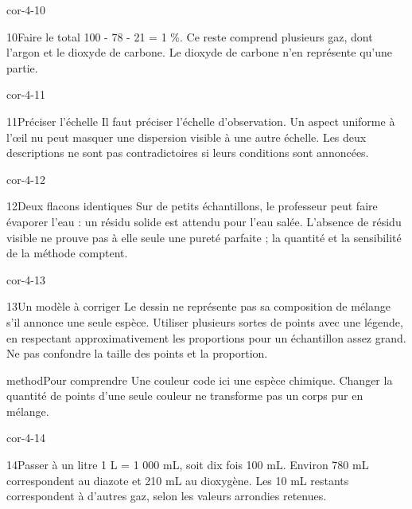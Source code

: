 \documentclass[12pt,twoside,openany]{book}
\begin{document}
\begin{blocLivre}{cor-4-10}
\begin{corrige}{10}{Faire le total}
100 - 78 - 21 = 1 \%. Ce reste comprend plusieurs gaz, dont l’argon et le dioxyde de carbone. Le dioxyde de carbone n’en représente qu’une partie.\par
\end{corrige}\end{blocLivre}
\begin{blocLivre}{cor-4-11}
\begin{corrige}{11}{Préciser l’échelle}
Il faut préciser l’échelle d’observation. Un aspect uniforme à l’œil nu peut masquer une dispersion visible à une autre échelle. Les deux descriptions ne sont pas contradictoires si leurs conditions sont annoncées.\par
\end{corrige}\end{blocLivre}
\begin{blocLivre}{cor-4-12}
\begin{corrige}{12}{Deux flacons identiques}
Sur de petits échantillons, le professeur peut faire évaporer l’eau : un résidu solide est attendu pour l’eau salée. L’absence de résidu visible ne prouve pas à elle seule une pureté parfaite ; la quantité et la sensibilité de la méthode comptent.\par
\end{corrige}\end{blocLivre}
\begin{blocLivre}{cor-4-13}
\begin{corrige}{13}{Un modèle à corriger}
Le dessin ne représente pas sa composition de mélange s’il annonce une seule espèce. Utiliser plusieurs sortes de points avec une légende, en respectant approximativement les proportions pour un échantillon assez grand. Ne pas confondre la taille des points et la proportion.\par
\begin{pcEncadre}{method}{Pour comprendre}
Une couleur code ici une espèce chimique. Changer la quantité de points d’une seule couleur ne transforme pas un corps pur en mélange.\par
\end{pcEncadre}
\end{corrige}\end{blocLivre}
\begin{blocLivre}{cor-4-14}
\begin{corrige}{14}{Passer à un litre}
1 L = 1 000 mL, soit dix fois 100 mL. Environ 780 mL correspondent au diazote et 210 mL au dioxygène. Les 10 mL restants correspondent à d’autres gaz, selon les valeurs arrondies retenues.\par
\end{corrige}\end{blocLivre}
\end{document}
